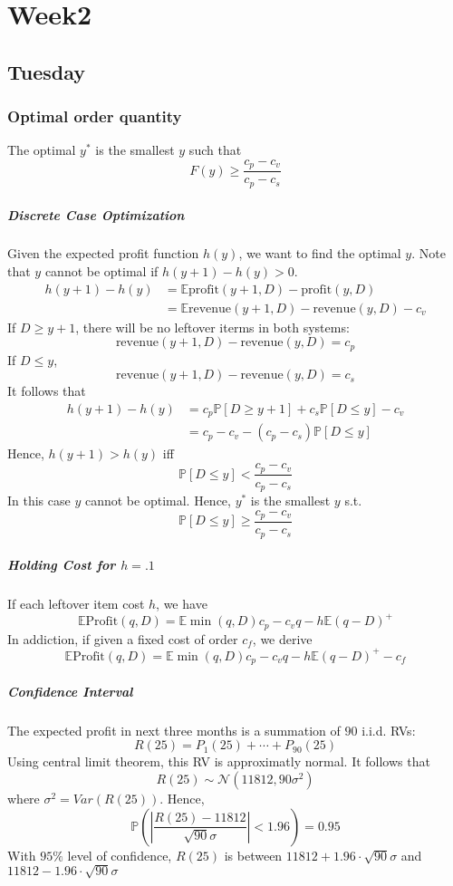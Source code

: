 
\chapter{Week2}
\section{Tuesday}
\subsection{Optimal order quantity}
The optimal $y^*$ is the smallest $y$ such that
\[
F(y)\ge\frac{c_p-c_v}{c_p-c_s}
\]
\paragraph{Discrete Case Optimization} Given the expected profit function $h(y)$, we want to find the optimal $y$. Note that $y$ cannot be optimal if $h(y+1) - h(y)>0$.
\[
\begin{aligned}
h(y+1) - h(y)&=\mathbb{E}\mbox{profit}(y+1,D) - \mbox{profit}(y,D)\\
&=\mathbb{E}\mbox{revenue}(y+1,D) - \mbox{revenue}(y,D) - c_v
\end{aligned}
\]
If $D\ge y+1$, there will be no leftover iterms in both systems:
\[
\mbox{revenue}(y+1,D) - \mbox{revenue}(y,D) = c_p
\]
If $D\le y$,
\[
\mbox{revenue}(y+1,D) - \mbox{revenue}(y,D) = c_s
\]
It follows that
\[
\begin{aligned}
h(y+1) - h(y) &=c_p\mathbb{P}[D\ge y+1] + c_s\mathbb{P}[D\le y] - c_v\\
&=c_p-c_v-(c_p-c_s)\mathbb{P}[D\le y]
\end{aligned}
\]
Hence, $h(y+1)>h(y)$ iff
\[
\mathbb{P}[D\le y]<\frac{c_p - c_v}{c_p - c_s}
\]
In this case $y$ cannot be optimal. Hence, $y^*$ is the smallest $y$ s.t.
\[
\mathbb{P}[D\le y]\ge\frac{c_p - c_v}{c_p - c_s}
\]
\paragraph{Holding Cost for $h=.1$} If each leftover item cost $h$, we have
\[
\mathbb{E}\mbox{Profit}(q,D)
=\mathbb{E}\min(q,D)c_p - c_vq - h\mathbb{E}(q-D)^+
\]
In addiction, if given a fixed cost of order $c_f$, we derive
\[
\mathbb{E}\mbox{Profit}(q,D)
=\mathbb{E}\min(q,D)c_p - c_vq - h\mathbb{E}(q-D)^+ - c_f
\]
\paragraph{Confidence Interval}
The expected profit in next three months is a summation of $90$ i.i.d. RVs:
\[
R(25) = P_1(25)+\cdots+P_{90}(25)
\]
Using central limit theorem, this RV is approximatly normal. It follows that
\[
R(25)\sim\mathcal{N}(11812,90\sigma^2)
\]
where $\sigma^2 = Var(R(25))$. Hence,
\[
\mathbb{P}
\left(
\left|\frac{R(25) - 11812}{\sqrt{90}\sigma}\right|<1.96
\right)
= 0.95
\]
With $95\%$ level of confidence, $R(25)$ is between $11812 + 1.96\cdot\sqrt{90}\sigma$ and $11812 - 1.96\cdot\sqrt{90}\sigma$
